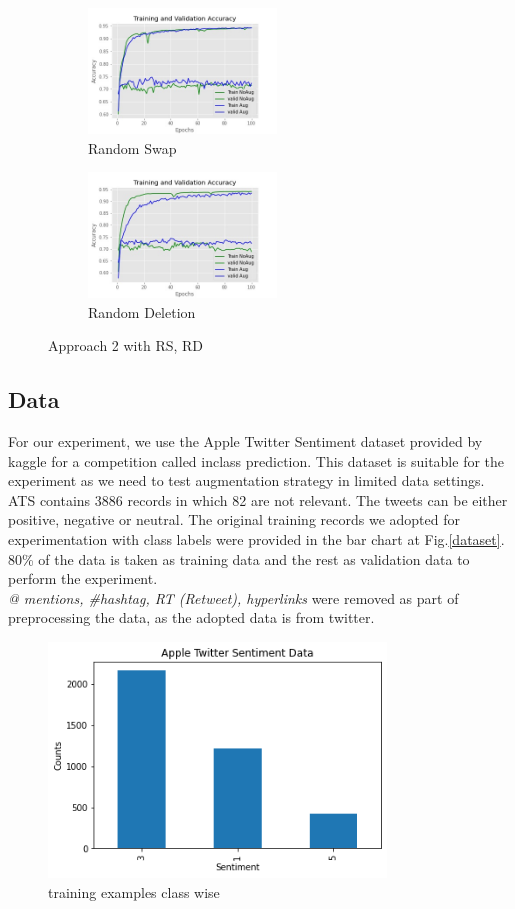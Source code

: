 \documentclass{article}
\begin{document}
\begin{figure}
  \begin{subfigure}{6cm}
    \centering\includegraphics[width=5cm]{accuracyrandomswapA2.jpg}
    \caption{Random Swap}
  \end{subfigure}
  \begin{subfigure}{6cm}
    \centering\includegraphics[width=5cm]{accuracyrandomdeleteA2.jpg}
    \caption{Random Deletion}
  \end{subfigure}
  \caption{Approach 2 with RS, RD}
  \label{fig:postaugmentA2}
\end{figure}


\subsection{Data}
For our experiment, we use the Apple Twitter Sentiment dataset provided by kaggle for a competition called inclass prediction. This dataset is suitable for the experiment as we need to test augmentation strategy in limited data settings. ATS contains 3886 records in which 82 are not relevant. The tweets can be either positive, negative or neutral. The original training records we adopted for experimentation with class labels were provided in the bar chart at Fig.\ref{dataset}. 80\% of the data is taken as training data and the rest as validation data to perform the experiment. \textit{\\@ mentions, \#hashtag, RT (Retweet), hyperlinks} were removed as part of preprocessing the data, as the adopted data is from twitter.


\begin{figure}[h!]
\centering
  \includegraphics[width=0.8\textwidth]{dataset.png}
  \caption{training examples class wise}
  \label{fig:dataset}
\end{figure}
\end{document}

